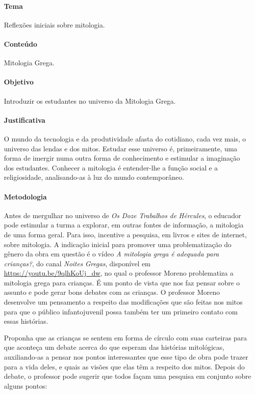 \documentclass[11pt]{extarticle}
\begin{document}
\paragraph{Tema} Reflexões iniciais sobre mitologia. 

\paragraph{Conteúdo} Mitologia Grega.

\paragraph{Objetivo} Introduzir os estudantes no universo da Mitologia Grega. 

\paragraph{Justificativa} O mundo da tecnologia e da produtividade afasta do cotidiano, cada vez mais, o universo das lendas e dos mitos. Estudar esse universo é, primeiramente, uma forma de imergir numa outra forma de conhecimento e estimular a imaginação dos estudantes. Conhecer a mitologia é entender-lhe a função social e a religiosidade, analisando-as à luz do mundo contemporâneo.  

\paragraph{Metodologia}

Antes de mergulhar no universo de \textit{Os Doze Trabalhos de Hércules}, o educador pode estimular a turma a explorar, em outras fontes de informação, a mitologia de uma forma geral. Para isso, incentive a pesquisa, em livros e sites de internet, sobre mitologia. A indicação inicial para promover uma problematização do gênero da obra em questão é o vídeo \textit{A mitologia grega é adequada para crianças?}, do canal \textit{Noites Gregas}, disponível em \url{https://youtu.be/9qlhKoUj_dw}, no qual o professor Moreno problematiza a mitologia grega para crianças. É um ponto de vista que nos faz pensar sobre o assunto e pode gerar bons debates com as crianças. O professor Moreno desenvolve um pensamento a respeito das modificações que são feitas nos mitos para que o público infantojuvenil possa também ter um primeiro contato com essas histórias. 

Proponha que as crianças se sentem em forma de círculo com suas carteiras para que aconteça um debate acerca do que esperam das histórias mitológicas, auxiliando-as a pensar nos pontos interessantes que esse tipo de obra pode trazer para a vida deles, e quais as visões que elas têm a respeito dos mitos. Depois do debate, o professor pode sugerir que todos façam uma pesquisa em conjunto sobre alguns pontos:
\end{document}
